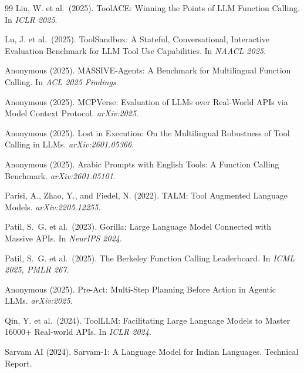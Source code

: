 \documentclass[11pt]{article}
\begin{document}
\begin{thebibliography}{99}
Liu, W. et al.\ (2025).
\newblock ToolACE: Winning the Points of LLM Function Calling.
\newblock In \textit{ICLR 2025}.

Lu, J. et al.\ (2025).
\newblock ToolSandbox: A Stateful, Conversational, Interactive Evaluation Benchmark for LLM Tool Use Capabilities.
\newblock In \textit{NAACL 2025}.

Anonymous (2025).
\newblock MASSIVE-Agents: A Benchmark for Multilingual Function Calling.
\newblock In \textit{ACL 2025 Findings}.

Anonymous (2025).
\newblock MCPVerse: Evaluation of LLMs over Real-World APIs via Model Context Protocol.
\newblock \textit{arXiv:2025}.

Anonymous (2025).
\newblock Lost in Execution: On the Multilingual Robustness of Tool Calling in LLMs.
\newblock \textit{arXiv:2601.05366}.

Anonymous (2025).
\newblock Arabic Prompts with English Tools: A Function Calling Benchmark.
\newblock \textit{arXiv:2601.05101}.

Parisi, A., Zhao, Y., and Fiedel, N. (2022).
\newblock TALM: Tool Augmented Language Models.
\newblock \textit{arXiv:2205.12255}.

Patil, S.~G. et al.\ (2023).
\newblock Gorilla: Large Language Model Connected with Massive APIs.
\newblock In \textit{NeurIPS 2024}.

Patil, S.~G. et al.\ (2025).
\newblock The Berkeley Function Calling Leaderboard.
\newblock In \textit{ICML 2025, PMLR 267}.

Anonymous (2025).
\newblock Pre-Act: Multi-Step Planning Before Action in Agentic LLMs.
\newblock \textit{arXiv:2025}.

Qin, Y. et al.\ (2024).
\newblock ToolLLM: Facilitating Large Language Models to Master 16000+ Real-world APIs.
\newblock In \textit{ICLR 2024}.

Sarvam AI (2024).
\newblock Sarvam-1: A Language Model for Indian Languages.
\newblock Technical Report.


\end{thebibliography}
\end{document}
